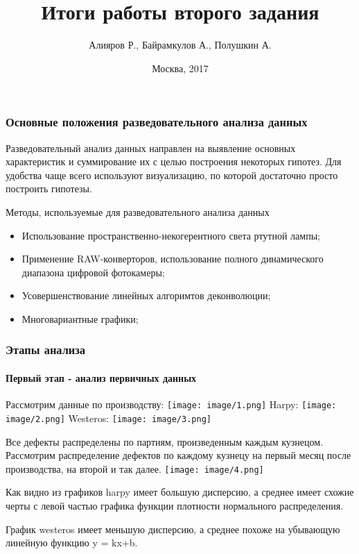 ﻿\documentclass{beamer}
\title{Итоги работы второго задания}
\author{Алияров Р., Байрамкулов А., Полушкин А.}
\institute{МГУ имени М. В. Ломоносова}
\date{Москва, 2017}
\begin{document}
\maketitle

\begin{frame}
\frametitle{Основные положения разведовательного анализа данных}
\begin{flushleft}
\small{Разведовательный анализ данных направлен на выявление основных характеристик и суммирование их с целью построения некоторых гипотез. Для удобства чаще всего используют визуализацию, по которой достаточно просто построить гипотезы.}
\end{flushleft}
\begin{center}
\begin{block}{Методы, используемые для разведовательного анализа данных}
\begin{itemize}
\item Использование пространственно-некогерентного света ртутной лампы;
\item Применение RAW-конверторов, использование полного динамического диапазона цифровой фотокамеры;
\item Усовершенствование линейных алгоримтов деконволюции;
\item Многовариантные графики;
\end{itemize}
\end{block}
\end{center}
\end{frame}

\begin{frame}
\begin{flushleft}
\frametitle{Этапы анализа}
\framesubtitle{Первый этап - анализ первичных данных}
\small{Рассмотрим данные по производству:}
\newline
\texttt{[image: image/1.png]}
\newline
\small{Harpy:}
\texttt{[image: image/2.png]}
\newline
\small{Westeros:}
\texttt{[image: image/3.png]}
\end{flushleft}
\end{frame}

\begin{frame}
\scriptsize{Все дефекты распределены по партиям, произведенным каждым кузнецом. Рассмотрим распределение дефектов по каждому кузнецу на первый месяц после производства, на второй и так далее.}
\texttt{[image: image/4.png]}
\newline
\scriptsize{Как видно из графиков harpy имеет большую дисперсию, а среднее имеет схожие черты с левой частью графика функции плотности нормального распределения.

График westeros имеет меньшую дисперсию, а среднее похоже на убывающую линейную функцию y = kx+b.}
\end{frame}
\end{document}
